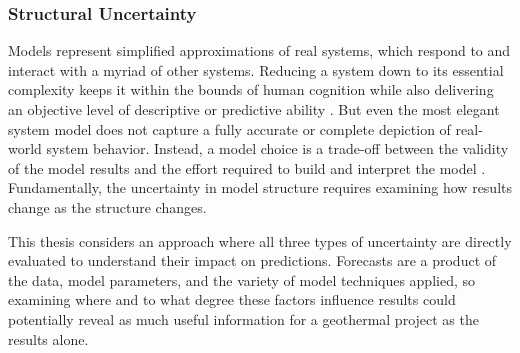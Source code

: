\subsubsection{Structural Uncertainty}\label{ch2:structural_uncertainty}
Models represent simplified approximations of real systems, which respond to and interact with a myriad of other systems. Reducing a system down to its essential complexity keeps it within the bounds of human cognition while also delivering an objective level of descriptive or predictive ability \citep[p.\ 306]{crawley_system_2015}. But even the most elegant system model does not capture a fully accurate or complete depiction of real-world system behavior. Instead, a model choice is a trade-off between the validity of the model results and the effort required to build and interpret the model \citep[p.\ 23]{morgan_best_2009}. Fundamentally, the uncertainty in model structure requires examining how results change as the structure changes.

This thesis considers an approach where all three types of uncertainty are directly evaluated to understand their impact on predictions. Forecasts are a product of the data, model parameters, and the variety of model techniques applied, so examining where and to what degree these factors influence results could potentially reveal as much useful information for a geothermal project as the results alone.

